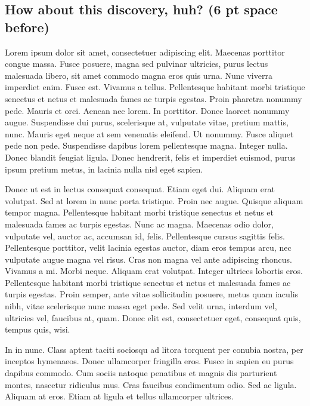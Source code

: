 \documentclass{biorxiv}
\begin{document}
\subsection{How about this discovery, huh? (6 pt space before)}
Lorem ipsum dolor sit amet, consectetuer adipiscing elit. Maecenas porttitor
congue massa. Fusce posuere, magna sed pulvinar ultricies, purus lectus
malesuada libero, sit amet commodo magna eros quis urna. Nunc viverra
imperdiet enim. Fusce est. Vivamus a tellus. Pellentesque habitant morbi
tristique senectus et netus et malesuada fames ac turpis egestas. Proin
pharetra nonummy pede. Mauris et orci. Aenean nec lorem. In porttitor. Donec
laoreet nonummy augue. Suspendisse dui purus, scelerisque at, vulputate vitae,
pretium mattis, nunc. Mauris eget neque at sem venenatis eleifend. Ut nonummy.
Fusce aliquet pede non pede. Suspendisse dapibus lorem pellentesque magna.
Integer nulla. Donec blandit feugiat ligula. Donec hendrerit, felis et
imperdiet euismod, purus ipsum pretium metus, in lacinia nulla nisl eget
sapien.

Donec ut est in lectus consequat consequat. Etiam eget dui. Aliquam erat
volutpat. Sed at lorem in nunc porta tristique. Proin nec augue. Quisque
aliquam tempor magna. Pellentesque habitant morbi tristique senectus et netus
et malesuada fames ac turpis egestas. Nunc ac magna. Maecenas odio dolor,
vulputate vel, auctor ac, accumsan id, felis. Pellentesque cursus sagittis
felis. Pellentesque porttitor, velit lacinia egestas auctor, diam eros tempus
arcu, nec vulputate augue magna vel risus. Cras non magna vel ante adipiscing
rhoncus. Vivamus a mi. Morbi neque. Aliquam erat volutpat. Integer ultrices
lobortis eros. Pellentesque habitant morbi tristique senectus et netus et
malesuada fames ac turpis egestas. Proin semper, ante vitae sollicitudin
posuere, metus quam iaculis nibh, vitae scelerisque nunc massa eget pede. Sed
velit urna, interdum vel, ultricies vel, faucibus at, quam. Donec elit est,
consectetuer eget, consequat quis, tempus quis, wisi.

In in nunc. Class aptent taciti sociosqu ad litora torquent per conubia
nostra, per inceptos hymenaeos. Donec ullamcorper fringilla eros. Fusce in
sapien eu purus dapibus commodo. Cum sociis natoque penatibus et magnis dis
parturient montes, nascetur ridiculus mus. Cras faucibus condimentum odio. Sed
ac ligula. Aliquam at eros. Etiam at ligula et tellus ullamcorper ultrices.
\end{document}
